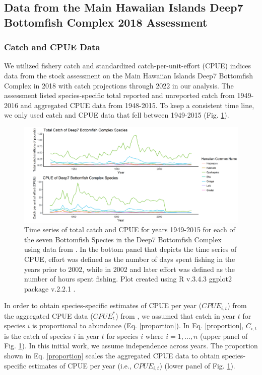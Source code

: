 \documentclass[oneside,12pt,final]{sty/ucthesis-CA2012}
\let\cite\citep                             %
\begin{document}
\begin{mainmatter}
\subsection{Data from the Main Hawaiian Islands Deep7 Bottomfish Complex 2018 Assessment}
\subsubsection{Catch and CPUE Data}
We utilized fishery catch and standardized catch-per-unit-effort (CPUE) indices data from the stock assessment on the Main Hawaiian Islands Deep7 Bottomfish Complex in 2018 with catch projections through 2022 \cite{langseth2018stock} in our analysis. The assessment listed species-specific total reported and unreported catch from 1949-2016 and aggregated CPUE data from 1948-2015. To keep a consistent time line, we only used catch and CPUE data that fell between 1949-2015 (Fig. \ref{catchandcpue}).

\begin{figure}[H]
     \centering
       \includegraphics[width=\textwidth]{fig/catch_cpue}
    \caption{Time series of total catch and CPUE for years 1949-2015 for each of the seven Bottomfish Species in the Deep7 Bottomfish Complex using data from \cite{langseth2018stock}. In the bottom panel that depicts the time series of CPUE,  effort was defined as the number of days spent fishing in the years prior to 2002, while in 2002 and later effort was defined as the number of hours spent fishing. Plot created using R v.3.4.3 \cite{Rcite} ggplot2 package v.2.2.1 \cite{ggplot}. }
    \label{catchandcpue}
\end{figure}

In order to obtain species-specific estimates of CPUE per year ($CPUE_{i,t}$) from the aggregated CPUE data ($CPUE_t^*$) from \cite{langseth2018stock}, we assumed that catch in year $t$ for species $i$ is proportional to abundance (Eq. \ref{proportion}). In Eq. \ref{proportion}, $C_{i,t}$ is the catch of species $i$ in year $t$ for species $i$ where $i=1,\dots,n$ (upper panel of Fig. \ref{catchandcpue}). In this initial work, we assume independence across years. The proportion shown in Eq. \ref{proportion} scales the aggregated CPUE data to obtain species-specific estimates of CPUE per year (i.e., $CPUE_{i,t}$) (lower panel of Fig. \ref{catchandcpue}).


\end{mainmatter}
\end{document}

